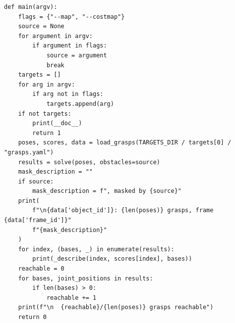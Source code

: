 \documentclass[11pt,a4paper]{book}
\begin{document}
\begin{lstlisting}[firstnumber=237]
def main(argv):
    flags = {"--map", "--costmap"}
    source = None
    for argument in argv:
        if argument in flags:
            source = argument
            break
    targets = []
    for arg in argv:
        if arg not in flags:
            targets.append(arg)
    if not targets:
        print(__doc__)
        return 1
    poses, scores, data = load_grasps(TARGETS_DIR / targets[0] / "grasps.yaml")
    results = solve(poses, obstacles=source)
    mask_description = ""
    if source:
        mask_description = f", masked by {source}"
    print(
        f"\n{data['object_id']}: {len(poses)} grasps, frame {data['frame_id']}"
        f"{mask_description}"
    )
    for index, (bases, _) in enumerate(results):
        print(_describe(index, scores[index], bases))
    reachable = 0
    for bases, joint_positions in results:
        if len(bases) > 0:
            reachable += 1
    print(f"\n  {reachable}/{len(poses)} grasps reachable")
    return 0


\end{lstlisting}
\end{document}
